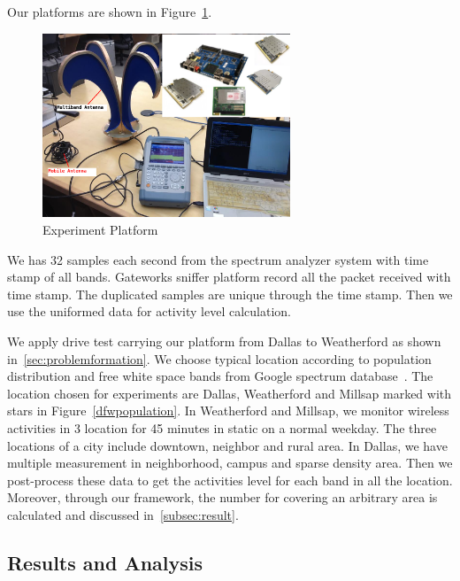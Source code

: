   Our platforms are shown in Figure~\ref{fig:equipment}.
  \begin{figure}
  \centering
  \includegraphics[width=74mm]{figures/equipment}
  \vspace{-0.1in}
  \caption{Experiment Platform}                                                                 
  \label{fig:equipment}
  \end{figure}
We has 32 samples each second from the spectrum analyzer system with time stamp of all bands.
Gateworks sniffer platform record all the packet received with time stamp. The duplicated 
samples are unique through the time stamp. Then we use the uniformed data for activity level
 calculation.  

We apply drive test carrying our platform from Dallas to Weatherford as shown in~\ref{sec:problemformation}.
We choose typical location according to population distribution and free white space bands 
from Google spectrum database~\cite{googledatabase}. The location chosen for experiments 
are Dallas, Weatherford and Millsap marked with stars in Figure~\ref{dfwpopulation}.
In Weatherford and Millsap, we monitor wireless activities in 3 location for 45 minutes in 
static on a normal weekday. The three locations of a city include downtown, neighbor and 
rural area. In Dallas, we have multiple measurement in neighborhood, campus and sparse density area.
Then we post-process these data to get the activities level for each band in all the location.
Moreover, through our framework, the number for covering an arbitrary area is calculated and discussed in~\ref{subsec:result}.



\subsection{Results and Analysis} 

